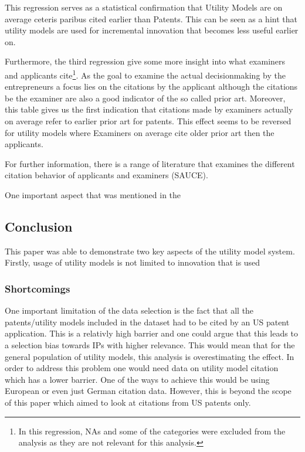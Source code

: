 \documentclass[
  12pt,
]{article}
\begin{document}
This regression serves as a statistical confirmation that Utility Models
are on average ceteris paribus cited earlier than Patents. This can be
seen as a hint that utility models are used for incremental innovation
that becomes less useful earlier on.

Furthermore, the third regression give some more insight into what
examiners and applicants cite\footnote{In this regression, NAs and some
  of the categories were excluded from the analysis as they are not
  relevant for this analysis.}. As the goal to examine the actual
decisionmaking by the entrepreneurs a focus lies on the citations by the
applicant although the citations be the examiner are also a good
indicator of the so called prior art. Moreover, this table gives us the
first indication that citations made by examiners actually on average
refer to earlier prior art for patents. This effect seems to be reversed
for utility models where Examiners on average cite older prior art then
the applicants.

For further information, there is a range of literature that examines
the different citation behavior of applicants and examiners (SAUCE).

One important aspect that was mentioned in the

\hypertarget{conclusion}{%
\subsection{Conclusion}\label{conclusion}}

This paper was able to demonstrate two key aspects of the utility model
system. Firstly, usage of utility models is not limited to innovation
that is used

\hypertarget{shortcomings}{%
\subsubsection{Shortcomings}\label{shortcomings}}

One important limitation of the data selection is the fact that all the
patents/utility models included in the dataset had to be cited by an US
patent application. This is a relativly high barrier and one could argue
that this leads to a selection bias towards IPs with higher relevance.
This would mean that for the general population of utility models, this
analysis is overestimating the effect. In order to address this problem
one would need data on utility model citation which has a lower barrier.
One of the ways to achieve this would be using European or even just
German citation data. However, this is beyond the scope of this paper
which aimed to look at citations from US patents only.
\end{document}
